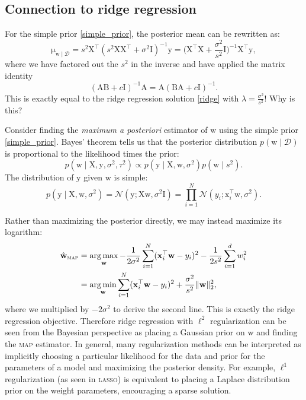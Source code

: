\documentclass{article}
\newcommand{\acro}[1]{\textsc{\MakeLowercase{#1}}}
\newcommand{\given}{\mid}
\newcommand{\mc}[1]{\mathcal{#1}}
\newcommand{\data}{\mc{D}}
\newcommand{\inv}{^{-1}}
\newcommand{\trans}{^\top}
\newcommand{\mat}[1]{\bm{\mathrm{#1}}}
\renewcommand{\vec}[1]{\bm{\mathrm{#1}}}
\DeclareMathOperator*{\argmin}{arg\,min}
\DeclareMathOperator*{\argmax}{arg\,max}
\begin{document}
\subsection*{Connection to ridge regression}

For the simple prior \eqref{simple_prior}, the posterior mean
can be rewritten as:
\begin{equation*}
  \vec{\mu}_{\vec{w}\given\data}
  =
  s^2
  \mat{X}\trans
  (s^2\mat{X}\mat{X}\trans + \sigma^2 \mat{I})\inv
  \vec{y}
  =
  \biggl(\mat{X}\trans\mat{X} + \frac{\sigma^2}{s^2} \mat{I}\biggr)\inv
  \mat{X}\trans
  \vec{y},
\end{equation*}
where we have factored out the $s^2$ in the inverse and have applied
the matrix identity
\begin{equation*}
  (\mat{A}\mat{B} + c\mat{I})\inv \mat{A} =
  \mat{A}(\mat{B}\mat{A} + c \mat{I})\inv.
\end{equation*}
This is exactly equal to the ridge regression solution \eqref{ridge}
with $\lambda = \frac{\sigma^2}{s^2}$!  Why is this?

Consider finding the \emph{maximum a posteriori} estimator of
$\vec{w}$ using the simple prior \eqref{simple_prior}.
Bayes' theorem tells us that the posterior distribution $p(\vec{w}
\given \data)$ is proportional to the likelihood times the prior:
\begin{equation*}
  p(\vec{w} \given \mat{X}, \vec{y}, \sigma^2, \tau^2)
  \propto
  p(\vec{y} \given \mat{X}, \vec{w}, \sigma^2)
  p(\vec{w} \given s^2).
\end{equation*}
The distribution of $\vec{y}$ given $\vec{w}$ is simple:
\begin{equation*}
  p(\vec{y} \given \mat{X}, \vec{w}, \sigma^2)
  =
  \mc{N}(\vec{y}; \mat{X}\vec{w}, \sigma^2\mat{I})
  =
  \prod_{i = 1}^N
  \mc{N}(y_i; \vec{x}_i\trans\vec{w}, \sigma^2).
\end{equation*}

Rather than maximizing the posterior directly, we may instead maximize
its logarithm:
\begin{align*}
  \hat{\vec{w}}_{\text{\acro{MAP}}}
  &=
  \argmax_{\vec{w}}
  -\frac{1}{2\sigma^2}
  \sum_{i = 1}^N
  (\vec{x}_i\trans \vec{w} - y_i)^2
  -
  \frac{1}{2s^2}
  \sum_{i = 1}^d
  w_i^2
  \\
  &=
  \argmin_{\vec{w}}
  \sum_{i = 1}^N
  (\vec{x}_i\trans \vec{w} - y_i)^2
  +
  \frac{\sigma^2}{s^2}
  \lVert \vec{w} \rVert_{2}^{2},
\end{align*}
where we multiplied by $-2\sigma^2$ to derive the second line.  This
is exactly the ridge regression objective.  Therefore ridge regression
with $\ell^2$ regularization can be seen from the Bayesian perspective
as placing a Gaussian prior on $\vec{w}$ and finding the \acro{MAP}
estimator.  In general, many regularization methods can be interpreted
as implicitly choosing a particular likelihood for the data and prior
for the parameters of a model and maximizing the posterior density.
For example, $\ell^1$ regularization (as seen in \acro{LASSO}) is
equivalent to placing a Laplace distribution prior on the weight
parameters, encouraging a sparse solution.
\end{document}
